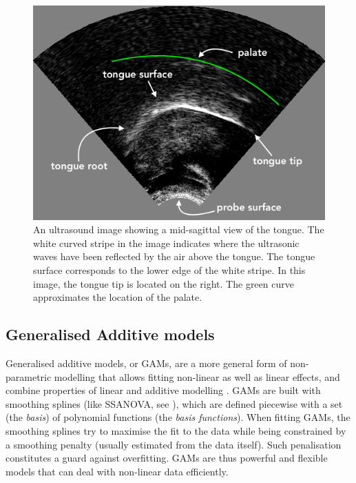 \documentclass[
  11pt,
]{article}
\begin{document}
\begin{figure}
  \centering
  \includegraphics{./img/Figure01-uti.png}
  \caption{An ultrasound image showing a mid-sagittal view of the tongue. The white curved stripe in the image indicates where the ultrasonic waves have been reflected by the air above the tongue. The tongue surface corresponds to the lower edge of the white stripe. In this image, the tongue tip is located on the right. The green curve approximates the location of the palate.}
  \label{f:uti}
\end{figure}

\hypertarget{generalised-additive-models}{%
\subsection{Generalised Additive
models}\label{generalised-additive-models}}

Generalised additive models, or GAMs, are a more general form of
non-parametric modelling that allows fitting non-linear as well as
linear effects, and combine properties of linear and additive modelling
\citep{hastie1986}. GAMs are built with smoothing splines (like SSANOVA,
see \citealt{helwig2016}), which are defined piecewise with a set (the
\emph{basis}) of polynomial functions (the \emph{basis functions}). When
fitting GAMs, the smoothing splines try to maximise the fit to the data
while being constrained by a smoothing penalty (usually estimated from
the data itself). Such penalisation constitutes a guard against
overfitting. GAMs are thus powerful and flexible models that can deal
with non-linear data efficiently.
\end{document}
